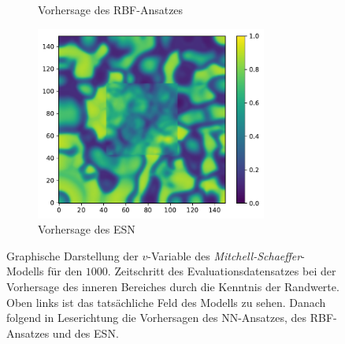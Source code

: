 \begin{appendices}
\begin{figure}[h]
\begin{subfigure}{.5\textwidth}
		\setcapmargin[1cm]{0.5cm}
  		\caption{Vorhersage des \textsc{RBF}-Ansatzes}
	\end{subfigure}%
	\begin{subfigure}{.5\textwidth}
		\centering
		\includegraphics[height=2.5in]{figures/results/inner_cross_prediction/mitchell_v_inner_esn.pdf}
		\setcapmargin[1cm]{0.5cm}
  		\caption{Vorhersage des \textsc{ESN}}
	\end{subfigure}
	\caption{Graphische Darstellung der $v$-Variable des \textit{Mitchell-Schaeffer}-Modells für den $1000$. Zeitschritt des Evaluationsdatensatzes bei der Vorhersage des inneren Bereiches durch die Kenntnis der Randwerte. Oben links ist das tatsächliche Feld des Modells zu sehen. Danach folgend in Leserichtung die Vorhersagen des \textsc{NN}-Ansatzes, des \textsc{RBF}-Ansatzes und des \textsc{ESN}.}
	\label{fig:apx_inner_cross_mitchell_result}
\end{figure} 


\end{appendices}
